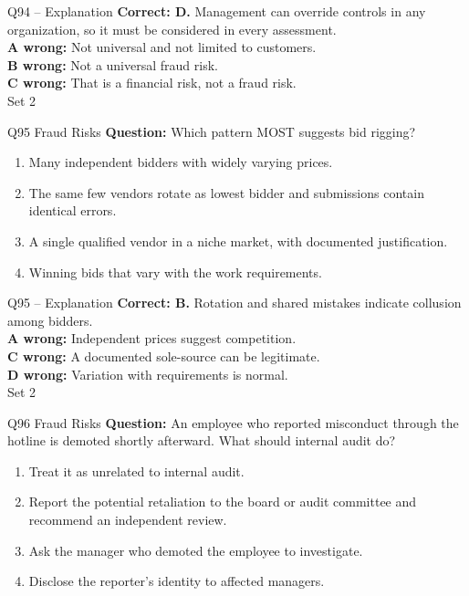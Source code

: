 \documentclass[aspectratio=169,10pt]{beamer}
\begin{document}
\begin{frame}[t]{Q94 -- Explanation}
	\footnotesize
	\textbf{Correct: D.} Management can override controls in any organization, so it must be considered in every assessment. \\[5pt]
\textbf{A wrong:} Not universal and not limited to customers. \\[3pt]
\textbf{B wrong:} Not a universal fraud risk. \\[3pt]
\textbf{C wrong:} That is a financial risk, not a fraud risk. \\[3pt]
	\vfill {\tiny Set 2}
\end{frame}

\begin{frame}[t]{Q95 \hfill {\scriptsize Fraud Risks}}
	\small
	\textbf{Question:} Which pattern MOST suggests bid rigging?
	\begin{enumerate}[label=\Alph*.,itemsep=1pt,topsep=3pt]
			\item Many independent bidders with widely varying prices.
			\item The same few vendors rotate as lowest bidder and submissions contain identical errors.
			\item A single qualified vendor in a niche market, with documented justification.
			\item Winning bids that vary with the work requirements.
	\end{enumerate}
\end{frame}

\begin{frame}[t]{Q95 -- Explanation}
	\footnotesize
	\textbf{Correct: B.} Rotation and shared mistakes indicate collusion among bidders. \\[5pt]
\textbf{A wrong:} Independent prices suggest competition. \\[3pt]
\textbf{C wrong:} A documented sole-source can be legitimate. \\[3pt]
\textbf{D wrong:} Variation with requirements is normal. \\[3pt]
	\vfill {\tiny Set 2}
\end{frame}

\begin{frame}[t]{Q96 \hfill {\scriptsize Fraud Risks}}
	\small
	\textbf{Question:} An employee who reported misconduct through the hotline is demoted shortly afterward. What should internal audit do?
	\begin{enumerate}[label=\Alph*.,itemsep=1pt,topsep=3pt]
			\item Treat it as unrelated to internal audit.
			\item Report the potential retaliation to the board or audit committee and recommend an independent review.
			\item Ask the manager who demoted the employee to investigate.
			\item Disclose the reporter's identity to affected managers.
	\end{enumerate}
\end{frame}
\end{document}

